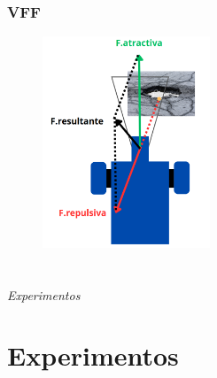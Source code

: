 \documentclass{beamer}
\begin{document}
\begin{frame}
	\frametitle{VFF}
	\begin{figure}
		\centering
		\includegraphics[width=5cm]{figs/vff.png}
	\end{figure}
	
\end{frame}
\section*{}
\begin{frame}{}
	\centering \Huge
	\emph{Experimentos}
\end{frame}

\section{Experimentos}
\end{document}
